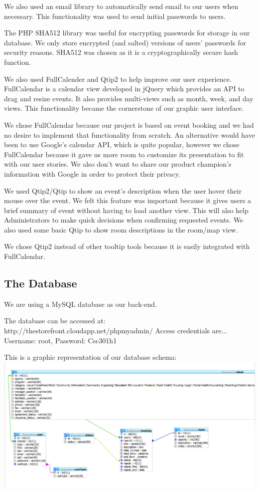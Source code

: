 \documentclass[12pt]{article}
\begin{document}
We also used an email library to automatically send email to our users when necessary. This functionality was used to send initial passwords to users.

The PHP SHA512 library was useful for encrypting passwords for storage in our database. We only store encrypted (and salted) versions of users’ passwords for security reasons. SHA512 was chosen as it is a cryptographically secure hash function.

We also used FullCalender and Qtip2 to help improve our user experience. FullCalendar is a calendar view developed in jQuery which provides an API to drag and resize events. It also provides multi-views such as month, week, and day views. This functionality became the cornerstone of our graphic user interface.

We chose FullCalendar because our project is based on event booking and we had no desire to implement that functionality from scratch. An alternative would have been to use Google's calendar API, which is quite popular, however we chose FullCalendar because it gave us more room to customize its presentation to fit with our user stories. We also don’t want to share our product champion’s information with Google in order to protect their privacy.

We used Qtip2/Qtip to show an event’s description when the user hover their mouse over the event. We felt this feature was important because it gives users a brief summary of event without having to load another view. This will also help Administrators to make quick decisions when confirming requested events. We also used some basic Qtip to show room descriptions in the room/map view.

We chose Qtip2 instead of other tooltip tools because it is easily integrated with FullCalendar.


\subsection{The Database}

We are using a MySQL database as our back-end.

The database can be accessed at: http://thestorefront.cloudapp.net/phpmyadmin/ \newline
Access credentials are... Username: root, Password: Csc301h1

This is a graphic representation of our database schema:
\includegraphics[width=\linewidth]{db_schema}
\end{document}
